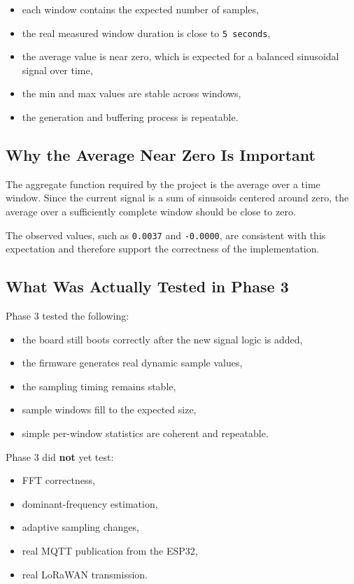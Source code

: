 \documentclass[12pt,a4paper]{article}
\begin{document}
\begin{itemize}
    \item each window contains the expected number of samples,
    \item the real measured window duration is close to \texttt{5 seconds},
    \item the average value is near zero, which is expected for a balanced
    sinusoidal signal over time,
    \item the min and max values are stable across windows,
    \item the generation and buffering process is repeatable.
\end{itemize}

\subsection{Why the Average Near Zero Is Important}

The aggregate function required by the project is the average over a time
window. Since the current signal is a sum of sinusoids centered around zero,
the average over a sufficiently complete window should be close to zero.

The observed values, such as \texttt{0.0037} and \texttt{-0.0000}, are
consistent with this expectation and therefore support the correctness of the
implementation.

\subsection{What Was Actually Tested in Phase 3}

Phase 3 tested the following:

\begin{itemize}
    \item the board still boots correctly after the new signal logic is added,
    \item the firmware generates real dynamic sample values,
    \item the sampling timing remains stable,
    \item sample windows fill to the expected size,
    \item simple per-window statistics are coherent and repeatable.
\end{itemize}

Phase 3 did \textbf{not} yet test:

\begin{itemize}
    \item FFT correctness,
    \item dominant-frequency estimation,
    \item adaptive sampling changes,
    \item real MQTT publication from the ESP32,
    \item real LoRaWAN transmission.
\end{itemize}
\end{document}

